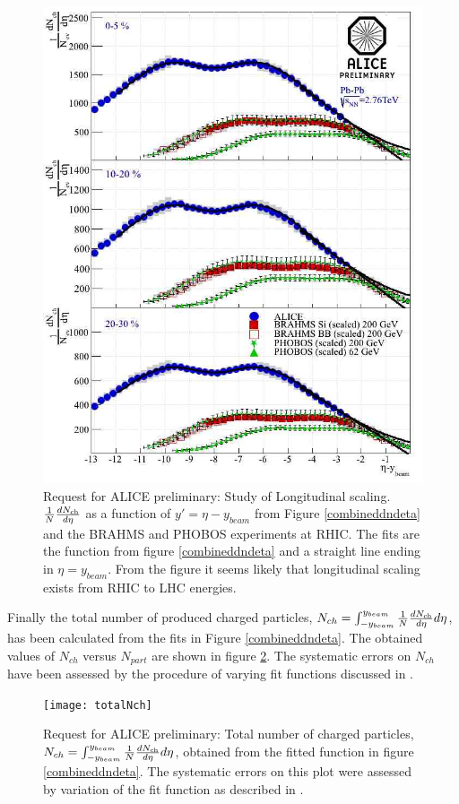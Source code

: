 \documentclass[11pt]{article}
\newcommand{\mult}[1][]{\ensuremath N_{\text{ch}#1}}
\newcommand{\dndeta}[1][]{{\ensuremath%
    \ifx|#1|\else\left.\fi%
    \frac{1}{N}\frac{d\mult{}}{d\eta}%
    \ifx|#1|\else\right|_{#1}\fi%
}}
\begin{document}
\begin{figure}
  \centering
  \includegraphics[keepaspectratio,width=\textwidth]{longscaling}
  \caption{Request for ALICE preliminary: Study of Longitudinal
    scaling. $\dndeta$ as a function of
$y'=\eta-y_{beam}$ from Figure \ref{combineddndeta} and the BRAHMS\cite{Bearden:2001qq} and
    PHOBOS\cite{Alver:2010ck} experiments at RHIC. The fits are the function
from figure \ref{combineddndeta} and a straight line ending in
$\eta=y_{beam}$. From the figure it seems likely that 
longitudinal scaling exists from RHIC to LHC energies.}
  \label{longscaling}
\end{figure} 
Finally the total number of produced charged particles,
$N_{ch}=\int^{y_{beam}}_{-y_{beam}}\dndeta d\eta$, has
been calculated from the fits in Figure \ref{combineddndeta}. The
obtained values of $N_{ch}$ versus $N_{part}$ are shown in figure
\ref{totalNch}. The systematic errors on $N_{ch}$ have been assessed
by the procedure of varying fit functions discussed in \cite{maxime}.
\begin{figure}
  \centering
  \texttt{[image: totalNch]}
  \caption{Request for ALICE preliminary: Total number of charged
    particles, $N_{ch}=\int^{y_{beam}}_{-y_{beam}}\dndeta d\eta$,
    obtained from the fitted function in figure
    \ref{combineddndeta}. The systematic errors on this plot were
    assessed by variation of the fit function as described in \cite{maxime}.}
  \label{totalNch}
\end{figure} 
\end{document}
